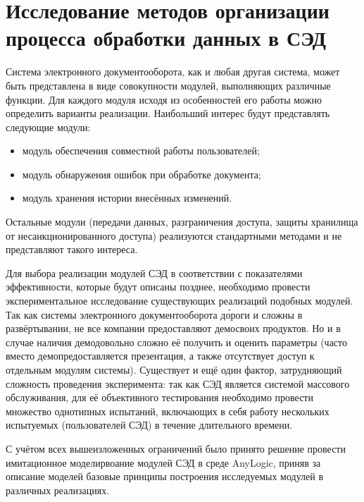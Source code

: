 \section{Исследование методов организации процесса обработки данных в СЭД} \label{experiment}

Система электронного документооборота, как и любая другая система, может быть представлена в виде совокупности модулей, выполняющих различные функции. %
Для каждого модуля исходя из особенностей его работы можно определить варианты реализации. Наибольший интерес будут представлять следующие модули:
\begin{itemize}
	\item модуль обеспечения совместной работы пользователей;
	\item модуль обнаружения ошибок при обработке документа;
	\item модуль хранения истории внесённых изменений.
\end{itemize}
Остальные модули (передачи данных, разграничения доступа, защиты хранилища от несанкционированного доступа) реализуются стандартными методами и не представляют такого интереса.

\vspace{\baselineskip}
Для выбора реализации модулей СЭД в соответствии с показателями эффективности, которые будут описаны позднее, необходимо провести экспериментальное исследование существующих реализаций подобных модулей. Так как системы электронного документооборота д\'{о}роги и сложны в развёртывании, не все компании предоставляют демо своих продуктов. Но и в случае наличия демо довольно сложно её получить и оценить параметры (часто вместо демо предоставляется презентация, а также отсутствует доступ к отдельным модулям системы). Существует и ещё один фактор, затрудняющий сложность проведения эксперимента: так как СЭД является системой массового обслуживания, для её объективного тестирования необходимо провести множество однотипных испытаний, включающих в себя работу нескольких испытуемых (пользователей СЭД) в течение длительного времени.

\vspace{\baselineskip}
С учётом всех вышеизложенных ограничений было принято решение провести имитационное моделирвоание модулей СЭД в среде AnyLogic, приняв за описание моделей базовые принципы построения исследуемых модулей в различных реализациях.

